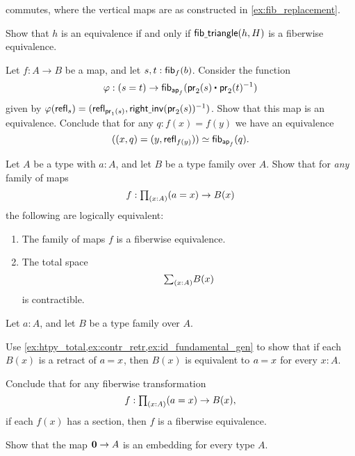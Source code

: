 \begin{exercises}
\begin{subexenum}
\begin{equation*}
\end{equation*}
commutes, where the vertical maps are as constructed in \cref{ex:fib_replacement}.
\item Show that $h$ is an equivalence if and only if $\mathsf{fib\underline{\ }{}triangle}(h,H)$ is a fiberwise equivalence.
\end{subexenum}
\item Let $f:A\to B$ be a map, and let $s,t : \mathsf{fib}_{f}(b)$. Consider the function
\begin{equation*}
\varphi : (s=t)\to \fib{\apfunc{f}}{\ct{\proj 2(s)}{\proj 2(t)^{-1}}}
\end{equation*}
given by $\varphi(\mathsf{refl}_{s})=(\mathsf{refl}_{\mathsf{pr}_{1}(s)},\mathsf{right\underline{\ }{}inv}(\mathsf{pr}_{2}(s))^{-1})$. Show that this map is an equivalence. Conclude that for any $q:f(x)=f(y)$ we have an equivalence
\begin{equation*}
((x,q)=(y,\mathsf{refl}_{f(y)})) \simeq \mathsf{fib}_{\mathsf{ap}_{f}}(q).
\end{equation*}
\item \label{ex:id_fundamental_gen}Let $A$ be a type with $a:A$, and let $B$ be a type family over $A$. Show that for \emph{any} family of maps
\begin{equation*}
f:\prd{x:A} (a=x)\to B(x)
\end{equation*}
the following are logically equivalent:
\begin{enumerate}
\item The family of maps $f$ is a fiberwise equivalence.
\item The total space
\begin{equation*}
\sm{x:A}B(x)
\end{equation*}
is contractible.
\end{enumerate}
\item \label{ex:id_fundamental_retr}Let $a:A$, and let $B$ be a type family over $A$. 
\begin{subexenum}
\item Use \autoref{ex:htpy_total,ex:contr_retr,ex:id_fundamental_gen} to show that if each $B(x)$ is a retract of $\id{a}{x}$, then $B(x)$ is equivalent to $\id{a}{x}$ for every $x:A$.
\item Conclude that for any fiberwise transformation
\begin{equation*}
f : \prd{x:A} (a=x) \to B(x),
\end{equation*}
if each $f(x)$ has a section, then $f$ is a fiberwise equivalence.
\end{subexenum}
\item Show that the map $\mathbf{0}\to A$ is an embedding for every type $A$.

\end{exercises}
